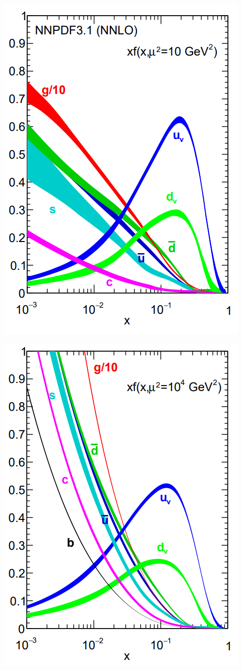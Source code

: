 \documentclass[a4paper, 12pt]{article}
\begin{document}
\vspace{0.2cm}
\begin{centering}
\begin{minipage}[t]{0.48\linewidth}
\centering
\includegraphics[width=0.7\linewidth]{NNPDF10.PNG}
\end{minipage}
\hfill
\begin{minipage}[t]{0.48\linewidth}
\centering
\includegraphics[width=0.7\linewidth]{NNPDF10000.PNG}

\end{minipage}
\end{centering}
\end{document}
